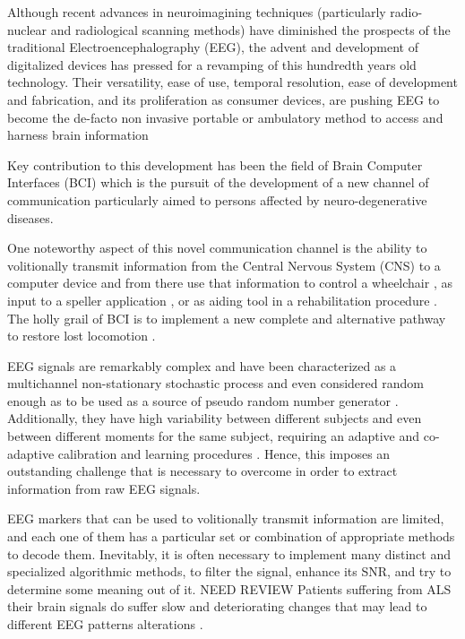 \documentclass[entropy,article,submit,moreauthors,pdftex,10pt,a4paper]{mdpi}
\begin{document}
Although recent advances in neuroimagining techniques (particularly radio-nuclear and radiological scanning methods) \citep{Schomer2010} have diminished the prospects of the traditional Electroencephalography (EEG), the advent and development of digitalized devices has pressed for a revamping of this hundredth years old technology.  Their versatility, ease of use, temporal resolution, ease of development and fabrication, and its proliferation as consumer devices, are pushing EEG to become the de-facto non invasive portable or ambulatory method to access and harness brain information \cite{DeVos2014}

Key contribution to this development has been the field of Brain Computer Interfaces (BCI) \citep{WolpawJonathanR2012} which is the pursuit of the development of a new channel of communication particularly aimed to persons affected by neuro-degenerative diseases.

One noteworthy aspect of this novel communication channel is the ability to volitionally transmit information from the Central Nervous System (CNS) to a computer device and from there use that information to control a wheelchair \citep{Carlson2013}, as input to a speller application \citep{Guger2009a}, or as aiding tool in a rehabilitation procedure \citep{Jure2016}.  The holly grail of BCI is to implement a new complete and alternative pathway to restore lost locomotion \citep{WolpawJonathanR2012}.

EEG signals are remarkably complex and have been characterized as a multichannel non-stationary stochastic process and even considered random enough as to be used as a source of pseudo random number generator \citep{Chen2014}. Additionally, they have high variability between different subjects and even between different moments for the same subject, requiring an adaptive and co-adaptive calibration and learning procedures \citep{Clerc}.  Hence, this imposes an outstanding challenge that is necessary to overcome in order to extract information from raw EEG signals.

EEG markers \citep{Clerc} that can be used to volitionally transmit information are limited, and each one of them has a particular set or combination of appropriate methods to decode them. Inevitably, it is often necessary to implement many distinct and specialized algorithmic methods, to filter the signal, enhance its SNR, and try to determine some meaning out of it.  NEED REVIEW Patients suffering from ALS their brain signals do suffer slow and deteriorating changes that may lead to different EEG patterns alterations \citep{Nijboer2009,Riener2014}.
\end{document}
